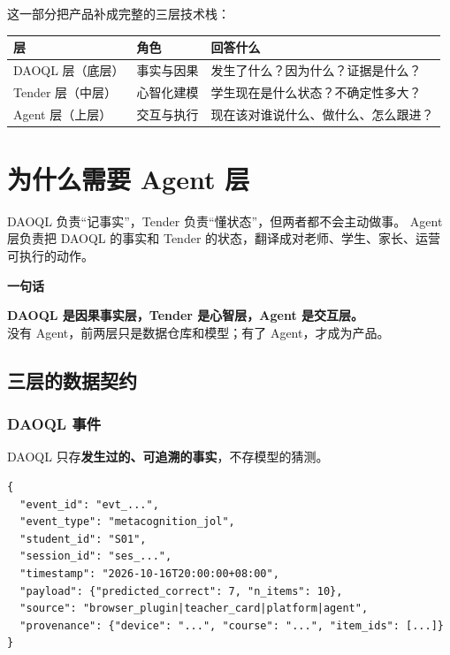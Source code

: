 \documentclass[UTF8,a4paper,11pt]{ctexart}
\newenvironment{explainbox}[1]
{\begin{center}\begin{minipage}{0.94\textwidth}\colorbox{boxbg}{\parbox{0.92\textwidth}{\textbf{#1}\par\vspace{2pt}}}}
{\end{minipage}\end{center}}
\begin{document}
这一部分把产品补成完整的三层技术栈：

\begin{center}
\begin{longtable}{@{}p{2.4cm}p{4.0cm}p{7.4cm}@{}}
\toprule
\textbf{层} & \textbf{角色} & \textbf{回答什么} \\
\midrule
DAOQL 层（底层） & 事实与因果 & 发生了什么？因为什么？证据是什么？ \\
Tender 层（中层） & 心智化建模 & 学生现在是什么状态？不确定性多大？ \\
Agent 层（上层） & 交互与执行 & 现在该对谁说什么、做什么、怎么跟进？ \\
\bottomrule
\end{longtable}
\end{center}

\section{为什么需要 Agent 层}

DAOQL 负责“记事实”，Tender 负责“懂状态”，但两者都不会主动做事。
Agent 层负责把 DAOQL 的事实和 Tender 的状态，翻译成对老师、学生、家长、运营可执行的动作。

\begin{explainbox}{一句话}
\textbf{DAOQL 是因果事实层，Tender 是心智层，Agent 是交互层。}\\
没有 Agent，前两层只是数据仓库和模型；有了 Agent，才成为产品。
\end{explainbox}

\subsection{三层的数据契约}

\subsubsection{DAOQL 事件}

DAOQL 只存\textbf{发生过的、可追溯的事实}，不存模型的猜测。

\begin{verbatim}
{
  "event_id": "evt_...",
  "event_type": "metacognition_jol",
  "student_id": "S01",
  "session_id": "ses_...",
  "timestamp": "2026-10-16T20:00:00+08:00",
  "payload": {"predicted_correct": 7, "n_items": 10},
  "source": "browser_plugin|teacher_card|platform|agent",
  "provenance": {"device": "...", "course": "...", "item_ids": [...]}
}
\end{verbatim}
\end{document}
